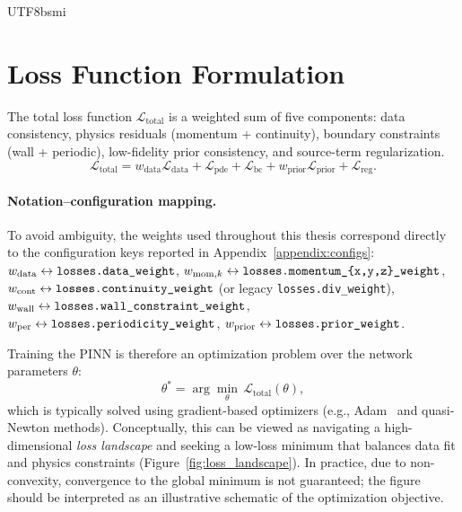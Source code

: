 \documentclass[master]{NTHUthesis}
\begin{document}
\begin{CJK*}{UTF8}{bsmi}
\section{Loss Function Formulation}
\label{sec:loss_function}
The total loss function $\mathcal{L}_{\text{total}}$ is a weighted sum of five components: data consistency, physics residuals (momentum + continuity), boundary constraints (wall + periodic), low-fidelity prior consistency, and source-term regularization.
\begin{equation}
    \label{eq:total_loss}
    \mathcal{L}_{\text{total}} =
    w_{\text{data}}\mathcal{L}_{\text{data}}
    + \mathcal{L}_{\text{pde}}
    + \mathcal{L}_{\text{bc}}
    + w_{\text{prior}}\mathcal{L}_{\text{prior}}
    + \mathcal{L}_{\text{reg}}.
\end{equation}

\paragraph{Notation--configuration mapping.}
To avoid ambiguity, the weights used throughout this thesis correspond directly to the configuration keys reported in Appendix~\ref{appendix:configs}:
$w_{\text{data}} \leftrightarrow \text{\texttt{losses.data\_weight}}$,
$w_{\text{mom},k} \leftrightarrow \text{\texttt{losses.momentum\_\{x,y,z\}\_weight}}$,
$w_{\text{cont}} \leftrightarrow \text{\texttt{losses.continuity\_weight}}$ (or legacy \texttt{losses.div\_weight}),
$w_{\text{wall}} \leftrightarrow \text{\texttt{losses.wall\_constraint\_weight}}$,
$w_{\text{per}} \leftrightarrow \text{\texttt{losses.periodicity\_weight}}$,
$w_{\text{prior}} \leftrightarrow \text{\texttt{losses.prior\_weight}}$.

Training the PINN is therefore an optimization problem over the network parameters $\theta$:
\begin{equation}
    \theta^{*} = \arg\min_{\theta}\, \mathcal{L}_{\text{total}}(\theta),
\end{equation}
which is typically solved using gradient-based optimizers (e.g., Adam~\cite{Kingma2015Adam} and quasi-Newton methods). Conceptually, this can be viewed as navigating a high-dimensional \emph{loss landscape} and seeking a low-loss minimum that balances data fit and physics constraints (Figure~\ref{fig:loss_landscape}). In practice, due to non-convexity, convergence to the global minimum is not guaranteed; the figure should be interpreted as an illustrative schematic of the optimization objective.


\end{CJK*}
\end{document}
